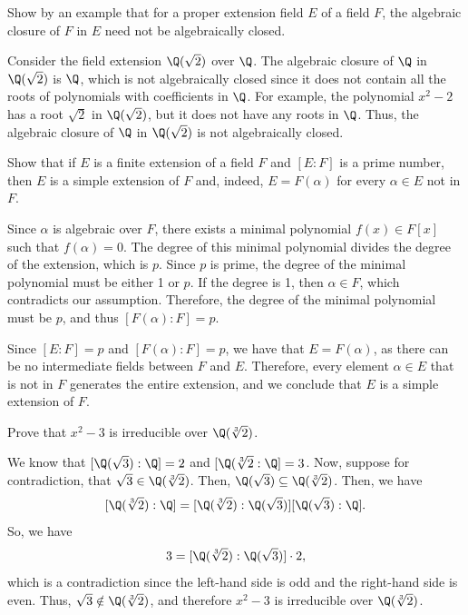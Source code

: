 \begin{problem}[40.18]
  Show by an example that for a proper extension field $E$ of a field $F$, the algebraic closure of $F$ in $E$ need not be algebraically closed.
\end{problem}

\begin{solution}
  Consider the field extension $\Q(\sqrt{2})$ over $\Q$. The algebraic closure of $\Q$ in $\Q(\sqrt{2})$ is $\Q$, which is not algebraically closed since it does not contain all the roots of polynomials with coefficients in $\Q$. For example, the polynomial $x^2 - 2$ has a root $\sqrt{2}$ in $\Q(\sqrt{2})$, but it does not have any roots in $\Q$. Thus, the algebraic closure of $\Q$ in $\Q(\sqrt{2})$ is not algebraically closed.
\end{solution}

\begin{problem}[40.23]
  Show that if $E$ is a finite extension of a field $F$ and $[E : F]$ is a prime number, then $E$ is a simple extension of $F$ and, indeed, $E = F(\alpha)$ for every $\alpha \in E$ not in $F$.
\end{problem}

\begin{solution}
  Since $\alpha$ is algebraic over $F$, there exists a minimal polynomial $f(x) \in F[x]$ such that $f(\alpha) = 0$. The degree of this minimal polynomial divides the degree of the extension, which is $p$. Since $p$ is prime, the degree of the minimal polynomial must be either 1 or $p$. If the degree is 1, then $\alpha \in F$, which contradicts our assumption. Therefore, the degree of the minimal polynomial must be $p$, and thus $[F(\alpha) : F] = p$.

  Since $[E : F] = p$ and $[F(\alpha) : F] = p$, we have that $E = F(\alpha)$, as there can be no intermediate fields between $F$ and $E$. Therefore, every element $\alpha \in E$ that is not in $F$ generates the entire extension, and we conclude that $E$ is a simple extension of $F$.
\end{solution}

\begin{problem}[40.24]
  Prove that $x^2 - 3$ is irreducible over $\Q(\sqrt[3]{2})$.
\end{problem}

\begin{solution}
  We know that $[\Q(\sqrt{3}) : \Q] = 2$ and $[\Q(\sqrt[3]{2} : \Q] = 3$. Now, suppose for contradiction, that $\sqrt{3} \in \Q(\sqrt[3]{2})$. Then, $\Q(\sqrt{3}) \subseteq \Q(\sqrt[3]{2})$. Then, we have
  \[%
    [\Q(\sqrt[3]{2}) : \Q] = [\Q(\sqrt[3]{2}) : \Q(\sqrt{3})][\Q(\sqrt{3}) : \Q]
  .\]%
  So, we have
  \[%
    3 = [\Q(\sqrt[3]{2}) : \Q(\sqrt{3})] \cdot 2
  ,\]%
  which is a contradiction since the left-hand side is odd and the right-hand side is even. Thus, $\sqrt{3} \notin \Q(\sqrt[3]{2})$, and therefore $x^2 - 3$ is irreducible over $\Q(\sqrt[3]{2})$.
\end{solution}


